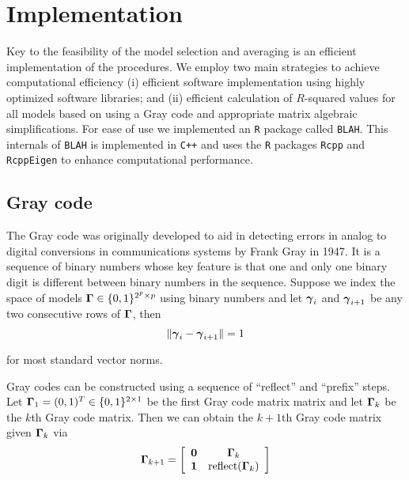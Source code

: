 \documentclass{article}[12pt]
\begin{document}
 

 



 
 
\newpage 
 

 
\section{Implementation}
\label{sec:implementation}

Key to the feasibility of the model selection and averaging is an efficient implementation of the procedures. We employ two main 
strategies to achieve computational efficiency (i) efficient software implementation using
highly optimized software libraries; and (ii) efficient calculation of
$R$-squared values for all models based on using a Gray code and appropriate
matrix algebraic simplifications.
For ease of use we 
implemented an {\tt R} package called {\tt BLAH}.
This internals of {\tt BLAH} is implemented
in {\tt C++} and uses the {\tt R} packages \texttt{Rcpp} and \texttt{RcppEigen} to enhance
computational performance.  

\subsection{Gray code} 
\label{sec:GrayCode}


The Gray code was originally developed to aid in detecting errors in analog to digital conversions in
communications systems by Frank Gray in 1947. It is a sequence of binary numbers whose key feature is that
one and only one binary digit is different between binary numbers in the sequence. 
Suppose we index the space of models ${\boldsymbol \Gamma} \in \{0,1\}^{2^p \times p}$ using binary numbers and let ${\boldsymbol \gamma}_i$ and ${\boldsymbol \gamma}_{i+1}$ be any two consecutive rows of ${\boldsymbol \Gamma}$,
then
$$
\| {\boldsymbol \gamma}_i - {\boldsymbol \gamma}_{i+1} \| = 1
$$

\noindent for most standard vector norms.
 
Gray codes can be constructed using a sequence of ``reflect'' and ``prefix'' steps.
Let ${\boldsymbol \Gamma}_1 = (0,1)^T \in \{0,1\}^{2\times 1}$ be the first Gray code matrix matrix and let ${\boldsymbol \Gamma}_k$ be the $k$th Gray code matrix. Then we can obtain the $k+1$th Gray code matrix given ${\boldsymbol \Gamma}_k$ via 
$$
\displaystyle {\boldsymbol\Gamma}_{k+1} = \left[\begin{array}{cc}
{\bf0} & {\boldsymbol \Gamma}_k \\
{\bf 1}  & \mbox{reflect}({\boldsymbol \Gamma}_k)
\end{array} \right]
$$ 
\end{document}
